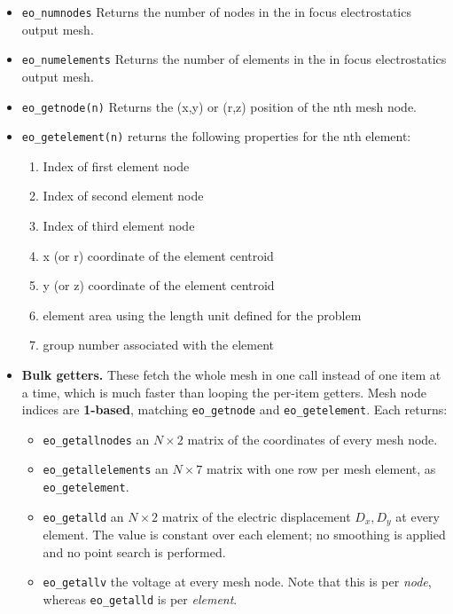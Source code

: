 \begin{itemize}
\item{\tt eo\_numnodes} Returns the number of nodes in the in focus electrostatics output mesh.
\item{\tt eo\_numelements} Returns the number of elements in the in focus electrostatics output mesh.
\item{\tt eo\_getnode(n)} Returns the (x,y) or (r,z) position of the nth mesh node.
\item{\tt eo\_getelement(n)} returns the following properties for the nth element:
    \begin{enumerate}
        \item Index of first element node
        \item Index of second element node
        \item Index of third element node
        \item x (or r) coordinate of the element centroid
        \item y (or z) coordinate of the element centroid
        \item element area using the length unit defined for the problem
        \item group number associated with the element
    \end{enumerate}


\item {\bf Bulk getters.}  These fetch the whole mesh in one call instead of one item at a time, which is much faster than looping the per-item getters.  Mesh node indices are {\bf 1-based}, matching {\tt eo\_getnode} and {\tt eo\_getelement}.  Each returns:

\begin{itemize}
\item{\tt eo\_getallnodes} an $N \times 2$ matrix of the coordinates of every mesh node.
\item{\tt eo\_getallelements} an $N \times 7$ matrix with one row per mesh element, as {\tt eo\_getelement}.
\item{\tt eo\_getalld} an $N \times 2$ matrix of the electric displacement $D_x, D_y$ at every element. The value is constant over each element; no smoothing is applied and no point search is performed.
\item{\tt eo\_getallv} the voltage at every mesh node. Note that this is per {\em node}, whereas {\tt eo\_getalld} is per {\em element}.
\end{itemize}

\end{itemize}
